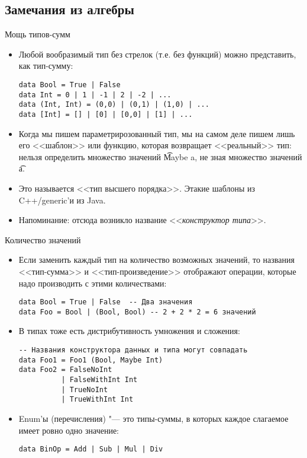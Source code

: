 \subsection{Замечания из алгебры}
\begin{frame}
\end{frame}

\begin{frame}[fragile]{Мощь типов-сумм}
	\begin{itemize}
		\item Любой вообразимый тип без стрелок (т.е. без функций) можно представить, как тип-сумму:
\begin{verbatim}
data Bool = True | False
data Int = 0 | 1 | -1 | 2 | -2 | ...
data (Int, Int) = (0,0) | (0,1) | (1,0) | ...
data [Int] = [] | [0] | [0,0] | [1] | ...
\end{verbatim}
		\item Когда мы пишем параметрирозованный тип, мы на самом деле пишем лишь его <<шаблон>> или функцию, которая возвращает <<реальный>> тип:
			нельзя определить множество значений \t{Maybe a}, не зная множество значений \t{a}.
		\item
			Это называется <<тип высшего порядка>>.
			Этакие шаблоны из C++/generic'и из Java.
		\item
			Напоминание: отсюда возникло название <<\textit{конструктор типа}>>.
	\end{itemize}
\end{frame}

\begin{frame}[fragile]{Количество значений}
	\begin{itemize}
		\item
			Если заменить каждый тип на количество возможных значений, то названия <<тип-сумма>> и <<тип-произведение>> отображают
			операции, которые надо производить с этими количествами:
\begin{verbatim}
data Bool = True | False  -- Два значения
data Foo = Bool | (Bool, Bool) -- 2 + 2 * 2 = 6 значений
\end{verbatim}
		\item
			В типах тоже есть дистрибутивность умножения и сложения:
\begin{verbatim}
-- Названия конструктора данных и типа могут совпадать
data Foo1 = Foo1 (Bool, Maybe Int)
data Foo2 = FalseNoInt
          | FalseWithInt Int
          | TrueNoInt
          | TrueWithInt Int
\end{verbatim}
		\item Enum'ы (перечисления) "--- это типы-суммы, в которых каждое слагаемое имеет ровно одно значение:
\begin{verbatim}
data BinOp = Add | Sub | Mul | Div
\end{verbatim}
	\end{itemize}
\end{frame}


